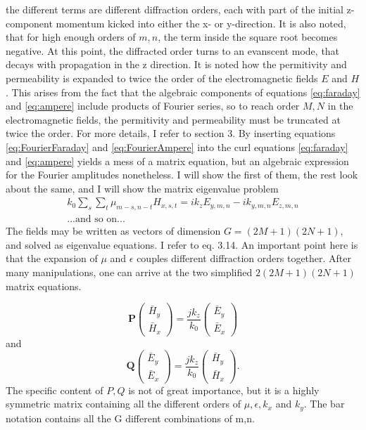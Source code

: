 the different terms are different diffraction orders, each with part of the initial z-component momentum kicked into either the x- or y-direction. It is also noted, that for high enough orders of $m,n$, the term inside the square root becomes negative.
At this point, the diffracted order turns to an evanscent mode, that decays with propagation in the z direction.
It is noted how the permitivity and permeability is expanded to twice the order of the electromagnetic fields $E$ and $H$. This arises
from the fact that the algebraic components of equations \ref{eq:faraday} and \ref{eq:ampere} include products of Fourier series, so to reach order $M,N$ in the electromagnetic fields,
the permitivity and permeability must be truncated at twice the order. For more details, I refer to \cite{fmm} section 3.
By inserting equations \ref{eq:FourierFaraday} and \ref{eq:FourierAmpere} into the curl equations \ref{eq:faraday} and \ref{eq:ampere} yields a mess of a matrix equation, but an algebraic expression for the Fourier amplitudes nonetheless. I will show the first of them, the rest look about the same, and I will show the matrix eigenvalue problem
\begin{align}
\label{eq:hell}
k_0 \sum_{s}\sum_{t} \mu_{m-s,n-t}H_{x,s,t} = ik_zE_{y,m,n}-ik_{y,m,n}E_{z,m,n}
\\
\text{...and so on...}
\end{align}
The fields  may be written as vectors of dimension $G=(2M+1)(2N+1)$, and solved as eigenvalue equations. I refer to \cite{fmm} eq. 3.14.
An important point here is that the expansion of $\mu$ and $\epsilon$ couples different diffraction orders together.
After many manipulations, one can arrive at the two simplified $2(2M+1)(2N+1)$ matrix equations.

\begin{equation}
\mathbf{P} \left(\begin{matrix}
    \bar H_y \\
    \bar H_x
\end{matrix}\right) = \frac{jk_z}{k_0}\left(\begin{matrix}
    \bar E_y \\
    \bar E_x
\end{matrix}\right)
\end{equation}
and 
\begin{equation}
\mathbf{Q} \left(\begin{matrix}
    \bar E_y \\
    \bar E_x
\end{matrix}\right) = \frac{jk_z}{k_0}\left(\begin{matrix}
    \bar H_y \\
    \bar H_x
\end{matrix}\right).
\end{equation}
The specific content of $P,Q$ is not of great importance, but it is a highly symmetric matrix containing all the different orders of $\mu,\epsilon,k_x$ and $k_y$.
The bar notation contains all the G different combinations of m,n.

